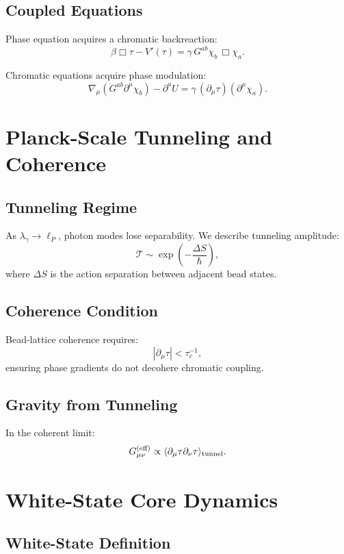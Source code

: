 \section{Coupled Equations}

Phase equation acquires a chromatic backreaction:
\[
\beta \Box \tau - V'(\tau)
=
\gamma\, G^{ab}\chi_b\,\Box\chi_a .
\]

Chromatic equations acquire phase modulation:
\[
\nabla_\mu(G^{ab}\partial^\mu\chi_b)
- \partial^a U
=
\gamma\,(\partial_\mu\tau)(\partial^\mu\chi_a).
\]


\chapter{Planck-Scale Tunneling and Coherence}

\section{Tunneling Regime}

As $\lambda_\gamma\to \ell_P$, photon modes lose separability.  
We describe tunneling amplitude:
\[
\mathcal{T} 
\sim 
\exp\left(-\frac{\Delta S}{\hbar}\right),
\]
where $\Delta S$ is the action separation between adjacent bead states.

\section{Coherence Condition}

Bead-lattice coherence requires:
\[
|\partial_\mu\tau| < \tau_c^{-1},
\]
ensuring phase gradients do not decohere chromatic coupling.

\section{Gravity from Tunneling}

In the coherent limit:
\[
G_{\mu\nu}^{(\text{eff})}
\propto
\langle \partial_\mu \tau \partial_\nu\tau \rangle_{\rm tunnel}.
\]


\chapter{White-State Core Dynamics}

\section{White-State Definition}

